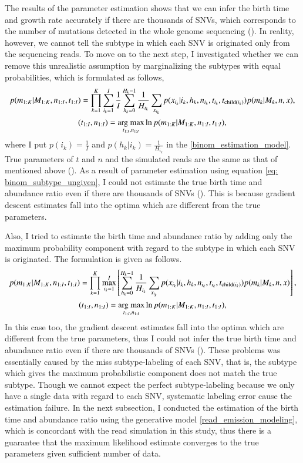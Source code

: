 \documentclass{article}
\begin{document}
The results of the parameter estimation shows that we can infer the birth time and growth rate accurately if there are thousands of SNVs, which corresponds to the number of mutations detected in the whole genome sequencing ().
In reality, however, we cannot tell the subtype in which each SNV is originated only from the sequencing reads.
To move on to the next step, I investigated whether we can remove this unrealistic assumption by marginalizing the subtypes with equal probabilities, which is formulated as follows,
\begin{gather}
 p(m_{1:K}|M_{1:K}, n_{1:I}, t_{1:I}) = \prod_{k=1}^{K} \sum_{i_k=1}^{I} \frac{1}{I} \sum_{h_k=0}^{H_k-1} \frac{1}{H_{i_k}} \sum_{x_{i_k}} p(x_{i_k} | i_k, h_k, n_{i_k}, t_{i_k}, t_{\mathrm{child}(i_k)}) p (m_k | M_k, n, x),\label{eq: binom_subtype_ungiven}\\
 (t_{1:I}, n_{1:I}) = \mathop{\rm arg~max}\limits_{t_{1:I}, n_{1:I}} \ln p(m_{1:K} | M_{1:K}, n_{1:I}, t_{1:I}),
\end{gather}
where I put $p(i_k) = \frac{1}{I}$ and $p(h_k | i_k) = \frac{1}{H_{i_k}}$ in the \eqref{binom_estimation_model}.
True parameters of $t$ and $n$ and the simulated reads are the same as that of mentioned above ().
As a result of parameter estimation using equation \eqref{eq: binom_subtype_ungiven}, I could not estimate the true birth time and abundance ratio even if there are thousands of SNVs ().
This is because gradient descent estimates fall into the optima which are different from the true parameters.

Also, I tried to estimate the birth time and abundance ratio by adding only the maximum probability component with regard to the subtype in which each SNV is originated.
The formulation is given as follows.
\begin{gather}
 p(m_{1:K}|M_{1:K}, n_{1:I}, t_{1:I}) = \prod_{k=1}^{K} \max_{i_k=1}^{I} \left[\sum_{h_k=0}^{H_k-1} \frac{1}{H_{i_k}} \sum_{x_{i_k}} p(x_{i_k} | i_k, h_k, n_{i_k}, t_{i_k}, t_{\mathrm{child}(i_k)}) p (m_k | M_k, n, x)\right],\label{eq: binom_subtype_ungiven}\\
 (t_{1:I}, n_{1:I}) = \mathop{\rm arg~max}\limits_{t_{1:I}, n_{1:I}} \ln p(m_{1:K} | M_{1:K}, n_{1:I}, t_{1:I}),
\end{gather}
In this case too, the gradient descent estimates fall into the optima which are different from the true parameters, thus I could not infer the true birth time and abundance ratio even if there are thousands of SNVs ().
These problems was essentially caused by the miss subtype-labeling of each SNV, that is, the subtype which gives the maximum probabilistic component does not match the true subtype.
Though we cannot expect the perfect subtype-labeling because we only have a single data with regard to each SNV, systematic labeling error cause the estimation failure.
In the next subsection, I conducted the estimation of the birth time and abundance ratio using the generative model \eqref{read_emission_modeling}, which is concordant with the read simulation in this study, thus there is a guarantee that the maximum likelihood estimate converges to the true parameters given sufficient number of data.
\end{document}
